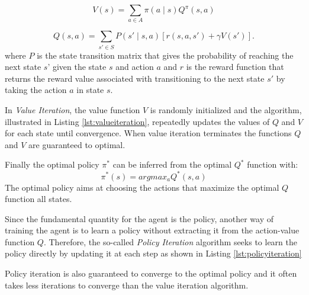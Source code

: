 \begin{equation}
  \label{eq:statevaluefromQ}
  V(s) = \sum_{a\in A} \pi(a \mid s) Q^{\pi} (s,a)
\end{equation}

\begin{equation}
  \label{eq:actionstatevaluefromV}
  Q(s,a) = \sum_{s'\in S} P(s' \mid s,a) [r(s,a,s') + \gamma V (s')].
\end{equation}
where $P$ is the state transition matrix that gives the probability of reaching the next state $s\textit{'}$ given the state $s$ and action $a$ and $r$ is the reward function that returns the reward value associated with transitioning to the next state $s'$ by taking the action $a$ in state $s$.

In \textit{Value Iteration}, the value function $V$ is randomly initialized and the algorithm, illustrated in Listing \ref{lst:valueiteration}, repeatedly updates the values of $Q$ and $V$ for each state until convergence. When value iteration terminates the functions $Q$ and $V$ are guaranteed to optimal.

\begin{center}
  \begin{minipage}{0.65\linewidth}
    
    \end{minipage}
\end{center}
Finally the optimal policy $\pi^{*}$ can be inferred from the optimal $Q^{*}$ function with:
\begin{equation}
  \label{eq:pifromq}
  \pi^{*}(s) = argmax_a Q^{*}(s,a)
\end{equation}
The optimal policy aims at choosing the actions that maximize the optimal $Q$ function all states.

Since the fundamental quantity for the agent is the policy, another way of training the agent is to learn a policy without extracting it from the action-value function $Q$. Therefore, the so-called \textit{Policy Iteration} algorithm seeks to learn the policy directly by updating it at each step as shown in Listing \ref{lst:policyiteration}
\begin{center}
  \begin{minipage}{0.65\linewidth}
    
    \end{minipage}
\end{center}
Policy iteration is also guaranteed to converge to the optimal policy and it often takes less iterations to converge than the value iteration algorithm.


